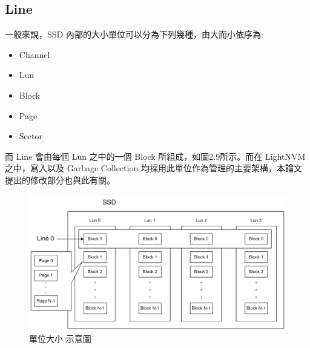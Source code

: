 \subsection{Line}\label{s2.4.1}
\indent
一般來說，SSD 內部的大小單位可以分為下列幾種，由大而小依序為:
\begin{itemize}
    \item Channel
    \item Lun
    \item Block
    \item Page
    \item Sector
\end{itemize}
而 Line 會由每個 Lun 之中的一個 Block 所組成，如圖2.9所示。而在 LightNVM 之中，寫入以及 Garbage Collection 均採用此單位作為管理的主要架構，本論文提出的修改部分也與此有關。
\begin{figure}[H]
    \centering
    \includegraphics[width=1\textwidth]{picture/ch2/Line.png}
    \caption{單位大小 示意圖}
    \label{f2.9}
\end{figure}